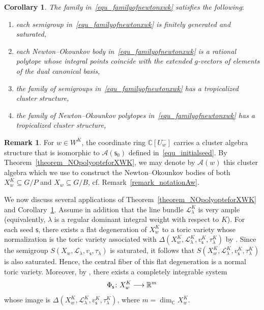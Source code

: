 \documentclass[11pt]{amsart}
\newcommand{\C}{\mathbb{C}}
\newcommand{\R}{\mathbb{R}}
\def\mcal{\mathcal}
\numberwithin{equation}{section}
\theoremstyle{plain}
\newtheorem{corollary}[theorem]{Corollary}
\theoremstyle{definition}
\newtheorem{remark}[theorem]{Remark}
\def\to{\mathchoice{\longrightarrow}{\rightarrow}{\rightarrow}{\rightarrow}}
\numberwithin{equation}{section}
\newcommand{\seed}{\mathsf{s}}
\begin{document}
\begin{corollary} \label{cor_theoremAstruct}
The family in~\eqref{equ_familyofnewtonxwk} satisfies the following$\colon$
\begin{enumerate}
\item each semigroup in~\eqref{equ_familyofnewtonxwk} is finitely generated and saturated,
\item each Newton--Okounkov body in~\eqref{equ_familyofnewtonxwk} is a rational polytope whose integral points coincide with the extended $g$-vectors of elements of the dual canonical basis,
\item the family of semigroups in~\eqref{equ_familyofnewtonxwk} has a tropicalized cluster structure,
\item the family of Newton--Okounkov polytopes in~\eqref{equ_familyofnewtonxwk} has a tropicalized cluster structure,
\end{enumerate}
\end{corollary}

\begin{remark}\label{def_clusteralgforSchpartialflag}
For $w \in W^K$, the coordinate ring $\C[U^-_{w}]$ carries a cluster algebra structure that is isomorphic to $\mcal{A}(\seed_0)$ defined in~\eqref{equ_initialseed}. By Theorem~\ref{theorem_NOpolyopteforXWK}, we may denote by $\mcal{A}(w)$ this cluster algebra which we use to construct the Newton--Okounkov bodies of both $X_w^K \subseteq G/P$ and $X_w \subseteq G/B$, cf. Remark~\ref{remark_notationAw}. 
\end{remark}


We now discuss several applications of Theorem~\ref{theorem_NOpolyopteforXWK} and Corollary~\ref{cor_theoremAstruct}. Assume in addition that the line bundle $\mcal{L}^K_\lambda$ is very ample (equivalently, $\lambda$ is a regular dominant integral weight with respect to $K$). For each seed $\seed$, there exists a flat degeneration of $X_w^K$ to a toric variety whose normalization is the toric variety associated with $\Delta(X_w^K, \mcal{L}^K_\lambda, v^K_{\seed}, \tau^K_\lambda)$ by \cite{And13}. Since the semigroup $S(X_w, \mcal{L}_\lambda, v_\seed, \tau_\lambda)$ is saturated, it follows that $S(X_w^K, \mcal{L}^K_\lambda, v^K_{\seed}, \tau^K_\lambda)$ is also saturated. Hence, the central fiber of this flat degeneration is a normal toric variety. Moreover, by \cite{HK15}, there exists a completely integrable system 
$$
\Phi_{\seed} \colon X_w^K \to \R^m
$$ 
whose image is  $\Delta(X_w^K, \mcal{L}^K_\lambda, v^K_{\seed}, \tau^K_\lambda)$, where $m = \dim_\C X_w^K$.
\end{document}
